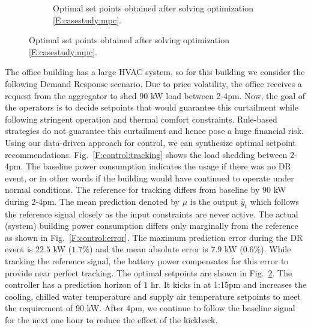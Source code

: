 \begin{figure}[t!]
%		
\begin{subfigure}
	\centering
	\setlength{}
	\setlength{}	
		
	\caption{Optimal set points obtained after solving optimization \eqref{E:casestudy:mpc}.}
	\label{F:control:all}
\end{subfigure}
\end{figure}

The office building has a large HVAC system, so for this building we consider the following Demand Response scenario. 
Due to price volatility, the office receives a request from the aggregator to shed \(90\) kW load between 2-4pm. 
Now, the goal of the operators is to decide setpoints that would guarantee this curtailment while following stringent operation and thermal comfort constraints. 
Rule-based strategies do not guarantee this curtailment and hence pose a huge financial risk. 
Using our data-driven approach for control, we can synthesize optimal setpoint recommendations.
Fig.~\ref{F:control:tracking} shows the load shedding between 2-4pm. 
The baseline power consumption indicates the usage if there was no DR event, or in other words if the building would have continued to operate under normal conditions. The reference for tracking differs from baseline by \(90\) kW during 2-4pm.
The mean prediction denoted by \(\mu\) is the output \(\bar{y}_{t}\) which follows the reference signal closely as the input constraints are never active. The actual (system) building power consumption differs only marginally from the reference as shown in Fig.~\ref{F:control:error}. The maximum prediction error during the DR event is \(22.5\) kW (\(1.7\%\)) and the mean absolute error is \(7.9\) kW (\(0.6\%\)). While tracking the reference signal, the battery power compensates for this error to provide near perfect tracking. The optimal setpoints are shown in Fig.~\ref{F:control:all}. The controller has a prediction horizon of \(1\) hr. It kicks in at 1:15pm and increases the cooling, chilled water temperature and supply air temperature setpoints to meet the requirement of \(90\) kW. After 4pm, we continue to follow the baseline signal for the next one hour to reduce the effect of the kickback.


